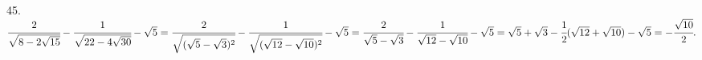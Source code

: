 45. $\cfrac{2}{\sqrt{8-2\sqrt{15}}}-\cfrac{1}{\sqrt{22-4\sqrt{30}}}-\sqrt{5}=\cfrac{2}{\sqrt{(\sqrt{5}-\sqrt{3})^2}}-\cfrac{1}{\sqrt{(\sqrt{12}-\sqrt{10})^2}}-\sqrt{5}=
\cfrac{2}{\sqrt{5}-\sqrt{3}}-\cfrac{1}{\sqrt{12}-\sqrt{10}}-\sqrt{5}=\sqrt{5}+\sqrt{3}-\cfrac{1}{2}(\sqrt{12}+\sqrt{10})-\sqrt{5}=-\cfrac{\sqrt{10}}{2}.$\\
